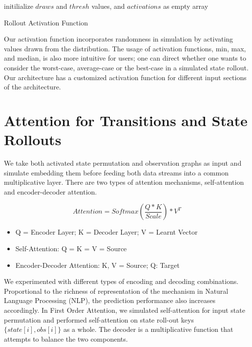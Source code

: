\documentclass[10pt, conference, compsocconf]{IEEEtran}
\begin{document}
\begin{algorithm}[h]
initilialize $draws$ and $thresh$ values, and $activations$ as empty array \;
{
}
\caption{{\sc Rollout Activation Function}}
\label{algo:rollout}
\end{algorithm}

Our activation function incorporates randomness in simulation by activating values drawn from the distribution. The usage of activation functions, min, max, and median, is also more intuitive for users; one can direct whether one wants to consider the worst-case, average-case or the best-case in a simulated state rollout. Our architecture has a customized activation function for different input sections of the architecture.


\section{Attention for Transitions and State Rollouts}
We take both activated state permutation and observation graphs as input and simulate embedding them before feeding both data streams into a common multiplicative layer. There are two types of attention mechanisms, self-attention and encoder-decoder attention. 

$$Attention = Softmax(\frac{Q*K}{Scale})*V^T$$
\begin{itemize}
    \item Q = Encoder Layer; K = Decoder Layer; V = Learnt Vector
    \item Self-Attention:            Q = K = V = Source 
    \item Encoder-Decoder Attention: K, V = Source; Q: Target
\end{itemize}

We experimented with different types of encoding and decoding combinations. Proportional to the richness of representation of the mechanism in Natural Language Processing (NLP), the prediction performance also increases accordingly. In {\sc First Order Attention}, we simulated self-attention for input state permutation and performed self-attention on state roll-out keys $\{state[i],obs[i]\}$ as a whole. The decoder is a multiplicative function that attempts to balance the two components.
\end{document}
